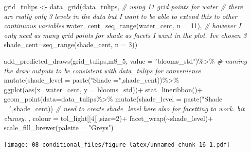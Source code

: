 \documentclass[
]{book}
\newenvironment{Shaded}{\begin{snugshade}}{\end{snugshade}}
\newcommand{\AttributeTok}[1]{\textcolor[rgb]{0.77,0.63,0.00}{#1}}
\newcommand{\CommentTok}[1]{\textcolor[rgb]{0.56,0.35,0.01}{\textit{#1}}}
\newcommand{\DecValTok}[1]{\textcolor[rgb]{0.00,0.00,0.81}{#1}}
\newcommand{\FunctionTok}[1]{\textcolor[rgb]{0.00,0.00,0.00}{#1}}
\newcommand{\NormalTok}[1]{#1}
\newcommand{\OtherTok}[1]{\textcolor[rgb]{0.56,0.35,0.01}{#1}}
\newcommand{\SpecialCharTok}[1]{\textcolor[rgb]{0.00,0.00,0.00}{#1}}
\newcommand{\StringTok}[1]{\textcolor[rgb]{0.31,0.60,0.02}{#1}}
\begin{document}
\begin{Shaded}
\begin{Highlighting}[]
\NormalTok{grid\_tulips }\OtherTok{\textless{}{-}} \FunctionTok{data\_grid}\NormalTok{(data\_tulips,}
                         \CommentTok{\# using 11 grid points for water}
                         \CommentTok{\# there are really only 3 levels in the data but I want to be able to extend this to other continuous variables}
                         \AttributeTok{water\_cent=}\FunctionTok{seq\_range}\NormalTok{(water\_cent, }\AttributeTok{n =} \DecValTok{11}\NormalTok{),}
                         \CommentTok{\# however I only need as many grid points for shade as facets I want in the plot. I\textquotesingle{}ve chosen 3}
                         \AttributeTok{shade\_cent=}\FunctionTok{seq\_range}\NormalTok{(shade\_cent, }\AttributeTok{n =} \DecValTok{3}\NormalTok{))}

\FunctionTok{add\_predicted\_draws}\NormalTok{(grid\_tulips,m8\_5,}
                    \AttributeTok{value =} \StringTok{"blooms\_std"}\NormalTok{)}\SpecialCharTok{\%\textgreater{}\%} \CommentTok{\# naming the draw outputs to be consistent with data\_tulips for convenience}
  \FunctionTok{mutate}\NormalTok{(}\AttributeTok{shade\_level =} \FunctionTok{paste}\NormalTok{(}\StringTok{"Shade ="}\NormalTok{,shade\_cent))}\SpecialCharTok{\%\textgreater{}\%}
  \FunctionTok{ggplot}\NormalTok{(}\FunctionTok{aes}\NormalTok{(}\AttributeTok{x=}\NormalTok{water\_cent, }\AttributeTok{y =}\NormalTok{ blooms\_std))}\SpecialCharTok{+}
  \FunctionTok{stat\_lineribbon}\NormalTok{()}\SpecialCharTok{+}
  \FunctionTok{geom\_point}\NormalTok{(}\AttributeTok{data=}\NormalTok{data\_tulips}\SpecialCharTok{\%\textgreater{}\%}
               \FunctionTok{mutate}\NormalTok{(}\AttributeTok{shade\_level =} \FunctionTok{paste}\NormalTok{(}\StringTok{"Shade ="}\NormalTok{,shade\_cent)) }\CommentTok{\# need to create shade\_level here also for facetting to work. bit clumsy.}
\NormalTok{             , }\AttributeTok{colour =}\NormalTok{ tol\_light[[}\DecValTok{4}\NormalTok{]],}\AttributeTok{size=}\DecValTok{2}\NormalTok{)}\SpecialCharTok{+}
  \FunctionTok{facet\_wrap}\NormalTok{(}\SpecialCharTok{\textasciitilde{}}\NormalTok{shade\_level)}\SpecialCharTok{+}
  \FunctionTok{scale\_fill\_brewer}\NormalTok{(}\AttributeTok{palette =} \StringTok{"Greys"}\NormalTok{)}
\end{Highlighting}
\end{Shaded}

\texttt{[image: 08-conditional\_files/figure-latex/unnamed-chunk-16-1.pdf]}
\end{document}
